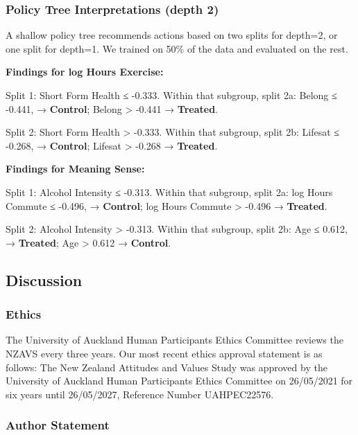 \documentclass[
  single column]{article}
\begin{document}
\subsubsection{Policy Tree Interpretations (depth
2)}\label{policy-tree-interpretations-depth-2}

A shallow policy tree recommends actions based on two splits for
depth=2, or one split for depth=1. We trained on 50\% of the data and
evaluated on the rest.

\textbf{Findings for log Hours Exercise:}

Split 1: Short Form Health ≤ -0.333. Within that subgroup, split 2a:
Belong ≤ -0.441, → \textbf{Control}; Belong \textgreater{} -0.441 →
\textbf{Treated}.

Split 2: Short Form Health \textgreater{} -0.333. Within that subgroup,
split 2b: Lifesat ≤ -0.268, → \textbf{Control}; Lifesat \textgreater{}
-0.268 → \textbf{Treated}.

\textbf{Findings for Meaning Sense:}

Split 1: Alcohol Intensity ≤ -0.313. Within that subgroup, split 2a: log
Hours Commute ≤ -0.496, → \textbf{Control}; log Hours Commute
\textgreater{} -0.496 → \textbf{Treated}.

Split 2: Alcohol Intensity \textgreater{} -0.313. Within that subgroup,
split 2b: Age ≤ 0.612, → \textbf{Treated}; Age \textgreater{} 0.612 →
\textbf{Control}.

\subsection{Discussion}\label{discussion}

\subsubsection{Ethics}\label{ethics}

The University of Auckland Human Participants Ethics Committee reviews
the NZAVS every three years. Our most recent ethics approval statement
is as follows: The New Zealand Attitudes and Values Study was approved
by the University of Auckland Human Participants Ethics Committee on
26/05/2021 for six years until 26/05/2027, Reference Number UAHPEC22576.

\subsubsection{Author Statement}\label{author-statement}
\end{document}
